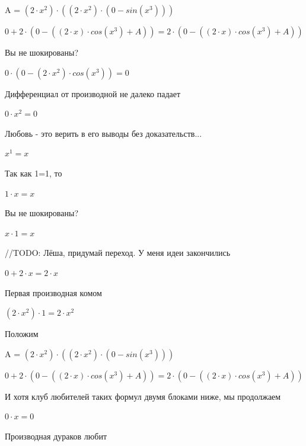 \documentclass[12pt,a4paper,fleqn]{article}
\begin{document}
\begin{center}
A = $(2 \cdot x^{2}) \cdot ((2 \cdot x^{2}) \cdot (0-sin(x^{3})))$\end{center}
\begin{center}
$0+2 \cdot (0-((2 \cdot x) \cdot cos(x^{3})+A)) = 2 \cdot (0-((2 \cdot x) \cdot cos(x^{3})+A))$\end{center}
Вы не шокированы?\cite{link3}

\begin{center}
$0 \cdot (0-(2 \cdot x^{2}) \cdot cos(x^{3})) = 0$\end{center}
Дифференциал от производной не далеко падает\cite{link2}

\begin{center}
$0 \cdot x^{2} = 0$\end{center}
Любовь - это верить в его выводы без доказательств...

\begin{center}
$x^{1} = x$\end{center}
Так как 1=1, то\cite{link4}

\begin{center}
$1 \cdot x = x$\end{center}
Вы не шокированы?\cite{link3}

\begin{center}
$x \cdot 1 = x$\end{center}
//TODO: Лёша, придумай переход. У меня идеи закончились

\begin{center}
$0+2 \cdot x = 2 \cdot x$\end{center}
Первая производная комом\cite{link2}

\begin{center}
$(2 \cdot x^{2}) \cdot 1 = 2 \cdot x^{2}$\end{center}
Положим

\begin{center}
A = $(2 \cdot x^{2}) \cdot ((2 \cdot x^{2}) \cdot (0-sin(x^{3})))$\end{center}
\begin{center}
$0+2 \cdot (0-((2 \cdot x) \cdot cos(x^{3})+A)) = 2 \cdot (0-((2 \cdot x) \cdot cos(x^{3})+A))$\end{center}
И хотя клуб любителей таких формул двумя блоками ниже, мы продолжаем

\begin{center}
$0 \cdot x = 0$\end{center}
Производная дураков любит\cite{link2}
\end{document}
